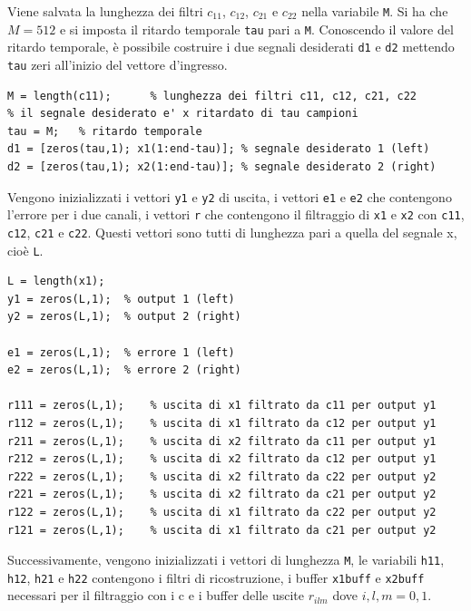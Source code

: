 \documentclass[12pt,a4paper,titlepage]{article}
\begin{document}
Viene salvata la lunghezza dei filtri $c_{11}$, $c_{12}$, $c_{21}$ e $c_{22}$ nella variabile \texttt{M}. Si ha che $M = 512$ e si imposta il ritardo temporale \texttt{tau} pari a \texttt{M}. Conoscendo il valore del ritardo temporale, è possibile costruire i due segnali desiderati \texttt{d1} e \texttt{d2} mettendo \texttt{tau} zeri all'inizio del vettore d'ingresso.

\begin{lstlisting}[label=code:segnale_desiderato_lms, caption=Costruzione del segnale desiderato, captionpos=b]
M = length(c11);      % lunghezza dei filtri c11, c12, c21, c22
% il segnale desiderato e' x ritardato di tau campioni
tau = M;   % ritardo temporale
d1 = [zeros(tau,1); x1(1:end-tau)]; % segnale desiderato 1 (left)
d2 = [zeros(tau,1); x2(1:end-tau)]; % segnale desiderato 2 (right)
\end{lstlisting}

Vengono inizializzati i vettori \texttt{y1} e \texttt{y2} di uscita, i vettori \texttt{e1} e \texttt{e2} che contengono l'errore per i due canali, i vettori \texttt{r} che contengono il filtraggio di \texttt{x1} e \texttt{x2} con \texttt{c11}, \texttt{c12}, \texttt{c21} e \texttt{c22}. Questi vettori sono tutti di lunghezza pari a quella del segnale x, cioè \texttt{L}.

\begin{lstlisting}[label=code:inizializzazione_vettori_L, caption=Inizializzazione dei vettori di lunghezza L, captionpos=b]
L = length(x1);
y1 = zeros(L,1);  % output 1 (left)
y2 = zeros(L,1);  % output 2 (right)

e1 = zeros(L,1);  % errore 1 (left)
e2 = zeros(L,1);  % errore 2 (right)

r111 = zeros(L,1);    % uscita di x1 filtrato da c11 per output y1
r112 = zeros(L,1);    % uscita di x1 filtrato da c12 per output y1
r211 = zeros(L,1);    % uscita di x2 filtrato da c11 per output y1
r212 = zeros(L,1);    % uscita di x2 filtrato da c12 per output y1
r222 = zeros(L,1);    % uscita di x2 filtrato da c22 per output y2
r221 = zeros(L,1);    % uscita di x2 filtrato da c21 per output y2
r122 = zeros(L,1);    % uscita di x1 filtrato da c22 per output y2
r121 = zeros(L,1);    % uscita di x1 filtrato da c21 per output y2
\end{lstlisting}

Successivamente, vengono inizializzati i vettori di lunghezza \texttt{M}, le variabili \texttt{h11},  \texttt{h12},  \texttt{h21} e  \texttt{h22} contengono i filtri di ricostruzione, i buffer \texttt{x1buff} e \texttt{x2buff} necessari per il filtraggio con i c e i buffer delle uscite $r_{ilm}$ dove $i, l, m = 0,1$.
\end{document}
